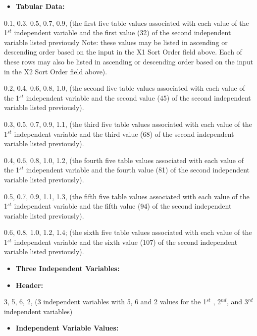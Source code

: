 \begin{itemize}
\tightlist
\item
  \textbf{Tabular Data:}
\end{itemize}

0.1, 0.3, 0.5, 0.7, 0.9, (the first five table values associated with each value of the 1\(^{st}\) independent variable and the first value (32) of the second independent variable listed previously Note: these values may be listed in ascending or descending order based on the input in the X1 Sort Order field above. Each of these rows may also be listed in ascending or descending order based on the input in the X2 Sort Order field above).

0.2, 0.4, 0.6, 0.8, 1.0, (the second five table values associated with each value of the 1\(^{st}\) independent variable and the second value (45) of the second independent variable listed previously).

0.3, 0.5, 0.7, 0.9, 1.1, (the third five table values associated with each value of the 1\(^{st}\) independent variable and the third value (68) of the second independent variable listed previously).

0.4, 0.6, 0.8, 1.0, 1.2, (the fourth five table values associated with each value of the 1\(^{st}\) independent variable and the fourth value (81) of the second independent variable listed previously).

0.5, 0.7, 0.9, 1.1, 1.3, (the fifth five table values associated with each value of the 1\(^{st}\) independent variable and the fifth value (94) of the second independent variable listed previously).

0.6, 0.8, 1.0, 1.2, 1.4; (the sixth five table values associated with each value of the 1\(^{st}\) independent variable and the sixth value (107) of the second independent variable listed previously).

\begin{itemize}
\item
  \textbf{Three Independent Variables:}
\item
  \textbf{Header:}
\end{itemize}

3, 5, 6, 2, (3 independent variables with 5, 6 and 2 values for the 1\(^{st}\) , 2\(^{nd}\), and 3\(^{rd}\) independent variables)

\begin{itemize}
\tightlist
\item
  \textbf{Independent Variable Values:}
\end{itemize}

